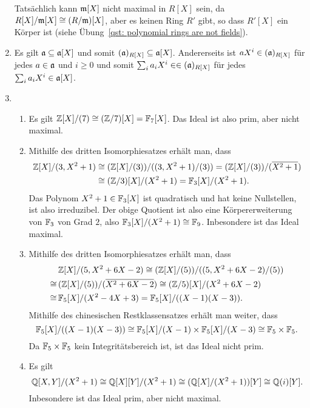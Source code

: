 \begin{solution}
\begin{enumerate}
      Tatsächlich kann $\mathfrak{m}[X]$ nicht maximal in $R[X]$ sein, da $R[X]/\mathfrak{m}[X] \cong (R/\mathfrak{m})[X]$, aber es keinen Ring $R'$ gibt, so dass $R'[X]$ ein Körper ist (siehe Übung~\ref{qst: polynomial rings are not fields}).
    \item
      Es gilt $\mathfrak{a} \subseteq \mathfrak{a}[X]$ und somit $(\mathfrak{a})_{R[X]} \subseteq \mathfrak{a}[X]$.
      Andererseits ist $a X^i \in (\mathfrak{a})_{R[X]}$ für jedes $a \in \mathfrak{a}$ und $i \geq 0$ und somit $\sum_i a_i X^i \in \in (\mathfrak{a})_{R[X]}$ für jedes $\sum_i a_i X^i \in \mathfrak{a}[X]$.
    \item
      \begin{enumerate}[leftmargin=*]
        \item
          Es gilt $\mathbb{Z}[X]/(7) \cong (\mathbb{Z}/7)[X] = \mathbb{F}_7[X]$.
          Das Ideal ist also prim, aber nicht maximal.
        \item
          Mithilfe des dritten Isomorphiesatzes erhält man, dass
          \begin{align*}
                    \mathbb{Z}[X]/(3, X^2 + 1)
            &\cong  ( \mathbb{Z}[X]/(3) ) / ( (3, X^2 + 1) / (3) )
             =      ( \mathbb{Z}[X]/(3) ) / ( \overline{X^2 + 1} )
            \\
            &\cong  (\mathbb{Z}/3)[X] / (X^2 + 1)
             =      \mathbb{F}_3[X] / (X^2 + 1).
          \end{align*}
          Das Polynom $X^2 +1 \in \mathbb{F}_3[X]$ ist quadratisch und hat keine Nullstellen, ist also irreduzibel.
          Der obige Quotient ist also eine Körpererweiterung von $\mathbb{F}_3$ von Grad $2$, also $\mathbb{F}_3[X] / (X^2 + 1) \cong \mathbb{F}_9$.
          Inbesondere ist das Ideal maximal.
        \item
          Mithilfe des dritten Isomorphiesatzes erhält man, dass
          \begin{align*}
                 &\,  \mathbb{Z}[X]/(5, X^2 + 6X - 2)
            \cong     (\mathbb{Z}[X]/(5)) / ((5, X^2 + 6X - 2)/(5))
          \\
            \cong&\,  (\mathbb{Z}[X]/(5)) / (\overline{X^2 + 6X - 2})
            \cong     (\mathbb{Z}/5)[X] / (X^2 + 6X -2)
          \\
            \cong&\,  \mathbb{F}_5[X] / (X^2 - 4X + 3)
            =         \mathbb{F}_5[X] / ( (X-1) (X-3) ).
          \end{align*}
          Mithilfe des chinesischen Restklassensatzes erhält man weiter, dass
          \[
                  \mathbb{F}_5[X] / ( (X-1)(X-3))
            \cong \mathbb{F}_5[X]/(X-1) \times \mathbb{F}_5[X]/(X-3)
            \cong \mathbb{F}_5 \times \mathbb{F}_5.
          \]
          Da $\mathbb{F}_5 \times \mathbb{F}_5$ kein Integritätsbereich ist, ist das Ideal nicht prim.
        \item
          Es gilt
          \[
                  \mathbb{Q}[X,Y]/(X^2 + 1)
            \cong \mathbb{Q}[X][Y]/(X^2 + 1)
            \cong (\mathbb{Q}[X]/(X^2 + 1))[Y]
            \cong \mathbb{Q}(i)[Y].
          \]
          Inbesondere ist das Ideal prim, aber nicht maximal.
      \end{enumerate}
  \end{enumerate}
\end{solution}


